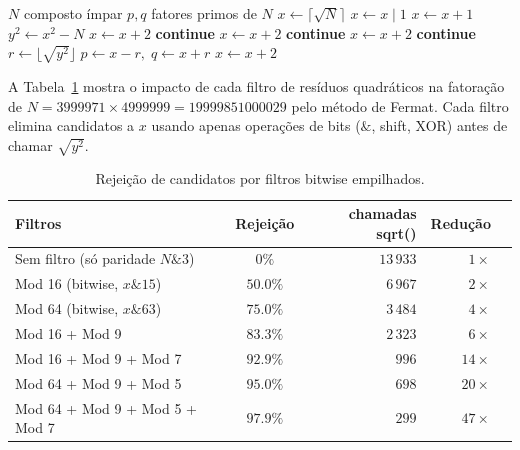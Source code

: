 \documentclass[12pt,a4paper]{article}
\theoremstyle{plain}
\begin{document}
\begin{algorithm}[H]
\caption{Fatoração de Fermat com filtros bitwise empilhados}
\label{alg:fermat_bitwise}
\begin{algorithmic}[1]
\Require $N$ composto ímpar
\Ensure $p,q$ fatores primos de $N$
\State $x \gets \lceil\sqrt{N}\rceil$
    \State $x \gets x \mid 1$ 
  \EndIf
\Else
    \State $x \gets x + 1$ 
  \EndIf
\EndIf
\Loop
  \State $y^2 \gets x^2 - N$
    \State $x \gets x + 2$ 
    \State \textbf{continue}
  \EndIf
    \State $x \gets x + 2$ 
    \State \textbf{continue}
  \EndIf
    \State $x \gets x + 2$ 
    \State \textbf{continue}
  \EndIf
  \State $r \gets \lfloor\sqrt{y^2}\rfloor$ 
    \State \Return $p \gets x - r,\; q \gets x + r$
  \EndIf
  \State $x \gets x + 2$
\EndLoop
\end{algorithmic}
\end{algorithm}

A Tabela~\ref{tab:filtros} mostra o impacto de cada filtro de resíduos
quadráticos na fatoração de $N = 3999971 \times 4999999 = 19999851000029$
pelo método de Fermat. Cada filtro elimina candidatos a $x$ usando
apenas operações de bits ($\&$, shift, XOR) antes de chamar
$\sqrt{y^2}$.

\begin{table}[htbp]
\centering
\caption{Rejeição de candidatos por filtros bitwise empilhados.}
\label{tab:filtros}
\begin{tabular}{lcrrr}
\hline
Filtros & Rejeição & chamadas sqrt() & Redução \\
\hline
Sem filtro (só paridade $N\&3$) & $0\%$ & $13\,933$ & $1\times$ \\
Mod 16 (bitwise, $x\&15$) & $50.0\%$ & $6\,967$ & $2\times$ \\
Mod 64 (bitwise, $x\&63$) & $75.0\%$ & $3\,484$ & $4\times$ \\
Mod 16 + Mod 9 & $83.3\%$ & $2\,323$ & $6\times$ \\
Mod 16 + Mod 9 + Mod 7 & $92.9\%$ & $996$ & $14\times$ \\
Mod 64 + Mod 9 + Mod 5 & $95.0\%$ & $698$ & $20\times$ \\
Mod 64 + Mod 9 + Mod 5 + Mod 7 & $97.9\%$ & $299$ & $47\times$ \\
\hline
\end{tabular}
\end{table}
\end{document}
